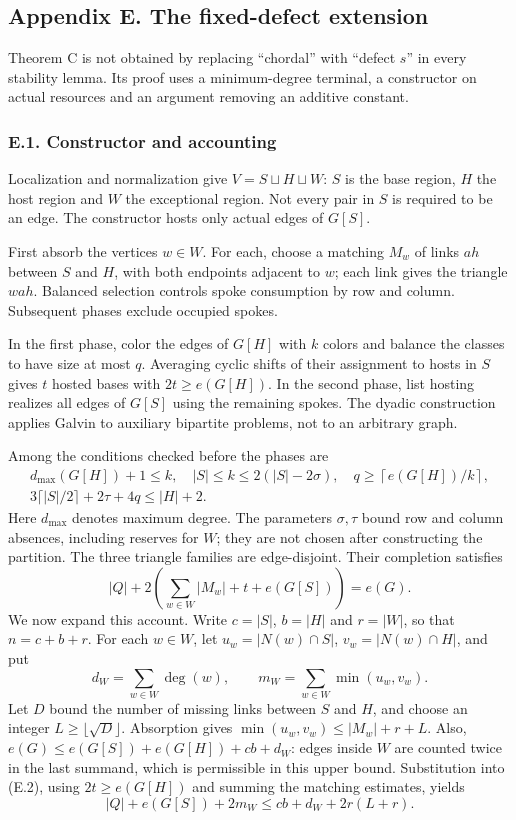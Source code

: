 \documentclass[english,11pt,a4paper]{article}
\begin{document}
\subsection{Appendix E. The fixed-defect extension}\label{appendix-e.-the-fixed-defect-extension}

Theorem C is not obtained by replacing ``chordal'' with ``defect \(s\)'' in every stability lemma. Its proof uses a minimum-degree terminal, a constructor on actual resources and an argument removing an additive constant.

\subsubsection{E.1. Constructor and accounting}\label{e.1.-constructor-and-accounting}

Localization and normalization give \(V=S\sqcup H\sqcup W\): \(S\) is the base region, \(H\) the host region and \(W\) the exceptional region. Not every pair in \(S\) is required to be an edge. The constructor hosts only actual edges of \(G[S]\).

First absorb the vertices \(w\in W\). For each, choose a matching \(M_w\) of links \(ah\) between \(S\) and \(H\), with both endpoints adjacent to \(w\); each link gives the triangle \(wah\). Balanced selection controls spoke consumption by row and column. Subsequent phases exclude occupied spokes.

In the first phase, color the edges of \(G[H]\) with \(k\) colors and balance the classes to have size at most \(q\). Averaging cyclic shifts of their assignment to hosts in \(S\) gives \(t\) hosted bases with \(2t\ge e(G[H])\). In the second phase, list hosting realizes all edges of \(G[S]\) using the remaining spokes. The dyadic construction applies Galvin to auxiliary bipartite problems, not to an arbitrary graph.

Among the conditions checked before the phases are \[
\begin{gathered}
d_{\max}(G[H])+1\le k,\quad |S|\le k\le2(|S|-2\sigma),\quad
q\ge\left\lceil e(G[H])/k\right\rceil,\\
3\lceil|S|/2\rceil+2\tau+4q\le |H|+2.
\end{gathered}
\tag{E.1}
\] Here \(d_{\max}\) denotes maximum degree. The parameters \(\sigma,\tau\) bound row and column absences, including reserves for \(W\); they are not chosen after constructing the partition. The three triangle families are edge-disjoint. Their completion satisfies \[
|Q|+2\left(\sum_{w\in W}|M_w|+t+e(G[S])\right)=e(G).
\tag{E.2}
\] We now expand this account. Write \(c=|S|\), \(b=|H|\) and \(r=|W|\), so that \(n=c+b+r\). For each \(w\in W\), let \(u_w=|N(w)\cap S|\), \(v_w=|N(w)\cap H|\), and put \[
d_W=\sum_{w\in W}\deg(w),\qquad
m_W=\sum_{w\in W}\min(u_w,v_w).
\] Let \(D\) bound the number of missing links between \(S\) and \(H\), and choose an integer \(L\ge\lfloor\sqrt D\rfloor\). Absorption gives \(\min(u_w,v_w)\le |M_w|+r+L\). Also, \(e(G)\le e(G[S])+e(G[H])+cb+d_W\): edges inside \(W\) are counted twice in the last summand, which is permissible in this upper bound. Substitution into (E.2), using \(2t\ge e(G[H])\) and summing the matching estimates, yields \[
|Q|+e(G[S])+2m_W\le cb+d_W+2r(L+r).
\tag{E.2a}
\]
\end{document}
